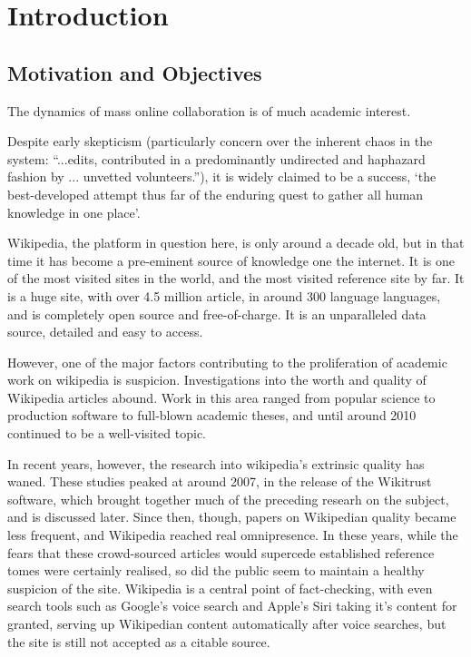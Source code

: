 \chapter{Introduction}

\section{Motivation and Objectives}

The dynamics of mass online collaboration is of much academic
interest.

Despite early skepticism (particularly concern over the
inherent chaos in the system: ``...edits, contributed in a
predominantly undirected and haphazard fashion by ... unvetted
volunteers.''\cite{Wilkinson2007}), it is widely claimed to be a
success, `the best-developed attempt thus far of the enduring quest to
gather all human knowledge in one place'\cite{Mesgari2014}.


Wikipedia, the platform in question here, is only around a
decade old, but in that time it has become a pre-eminent source of
knowledge one the internet. It is one of the most visited sites in the
world, and the most visited reference site by far. It is a huge site,
with over 4.5 million article, in around 300 language languages, and
is completely open source and free-of-charge. It is an unparalleled
data source, detailed and easy to access.

However, one of the major factors contributing to the proliferation of
academic work on wikipedia is suspicion. Investigations into the worth
and quality of Wikipedia articles abound. Work in this area ranged
from popular science to production software to full-blown academic
theses, and until around 2010 continued to be a well-visited topic.

In recent years, however, the research into wikipedia's extrinsic
quality has waned. These studies peaked at around 2007, in the release
of the Wikitrust software, which brought together much of the
preceding researh on the subject, and is discussed later. Since then,
though, papers on Wikipedian quality became less frequent, and
Wikipedia reached real omnipresence.  In these years, while the fears
that these crowd-sourced articles would supercede established
reference tomes were certainly realised, so did the public seem to
maintain a healthy suspicion of the site. Wikipedia is a central point
of fact-checking, with even search tools such as Google's voice search
and Apple's Siri taking it's content for granted, serving up
Wikipedian content automatically after voice searches, but the site is
still not accepted as a citable source.

